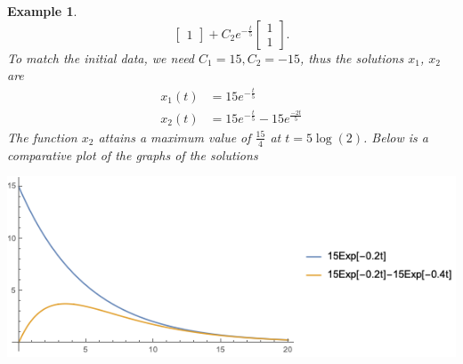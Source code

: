 \documentclass[11pt]{amsart}
\newtheorem{example}{Example}
\numberwithin{equation}{section}
\begin{document}
\begin{example}
\begin{equation*}
\begin{bmatrix}
1
\end{bmatrix} + C_2e^{-\frac{t}{5}}
\begin{bmatrix}
1\\
1
\end{bmatrix}.
\end{equation*}
To match the initial data, we need $C_1=15, C_2=-15$, thus the solutions $x_1$, $x_2$ are 
\begin{align*}
x_1(t) & = 15e^{-\frac{t}{5}} \\
x_2(t) & = 15e^{-\frac{t}{5}} - 15e^{\frac{-2t}{5}}
\end{align*}
The function $x_2$ attains a maximum value of $\frac{15}{4}$ at $t=5\log(2)$. Below is a comparative plot of the graphs of the solutions
\begin{center}
\includegraphics[width=0.8\linewidth]{p6.png} 
\end{center}
\end{example}
\end{document}
